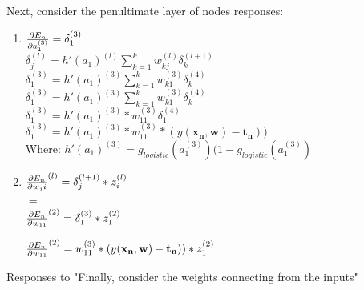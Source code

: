\documentclass[12pt,letterpaper]{article}
\renewcommand{\vec}[1]{\mathbf{#1}}
\begin{document}
Next, consider the penultimate layer of nodes responses:

\begin{enumerate}

	\item $\pdv{E_{n}}{a_{1}^{(3)}}= \delta_{1}^{(3)}$
	\\
	$\delta_{j}^{(l)}=h'(a_{1})^{(l)}\sum_{k=1}^{k}w_{kj}^{(l)}\delta_{k}^{(l+1)}$
	\\
	$\delta_{1}^{(3)}=h'(a_{1})^{(3)}\sum_{k=1}^{k}w_{k1}^{(3)}\delta_{k}^{(4)}$
	\\
	$\delta_{1}^{(3)}=h'(a_{1})^{(3)}\sum_{k=1}^{k}w_{k1}^{(3)}\delta_{k}^{(4)}$
	\\
	$\delta_{1}^{(3)}=h'(a_{1})^{(3)}*w_{11}^{(3)}\delta_{1}^{(4)}$
	\\
	$\delta_{1}^{(3)}=h'(a_{1})^{(3)}*w_{11}^{(3)}*(y(\vec{x_{n}},\vec{w})-\vec{t_{n}}))$
	\\
	Where:
	$h'(a_{1})^{(3)}=g_{logistic}(a_{1}^{(3)})(1-g_{logistic}(a_{1}^{(3)})$
	\\
	
	\item $\pdv{E_{n}}{w_ji}^{(l)}=\delta_{j}^{(l+1)}*z_{i}^{(l)}$
	\\
	$=$
	\\
	$\pdv{E_{n}}{w_{11}}^{(2)}=\delta_{1}^{(3)}*z_{1}^{(2)}$

	$\pdv{E_{n}}{w_{11}}^{(2)}=w_{11}^{(3)}*(y(\vec{x_{n}},\vec{w})-\vec{t_{n}}))*z_{1}^{(2)}$	

\end{enumerate}

Responses to "Finally, consider the weights connecting from the inputs"
\end{document}
